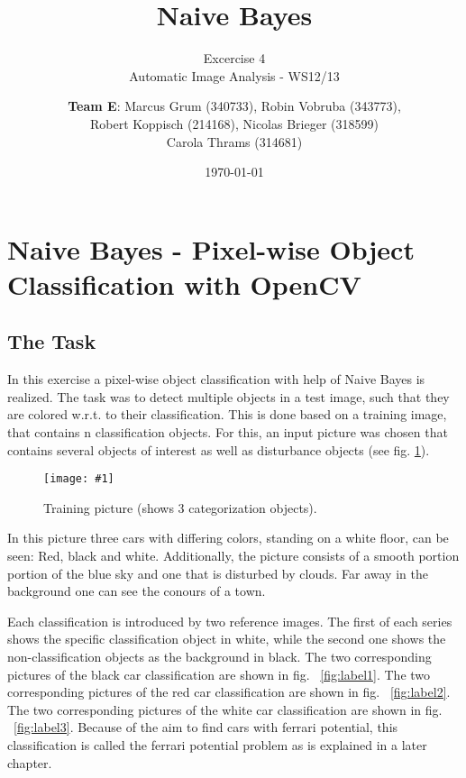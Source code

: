\documentclass[a4paper,headings=small]{scrartcl}
\title{Naive Bayes}
\subtitle{Excercise 4 \\ Automatic Image Analysis - WS12/13}
\author{\textbf{Team E}: Marcus Grum (340733), Robin Vobruba (343773), \\ Robert Koppisch (214168), Nicolas Brieger (318599)\\Carola Thrams (314681)}
\date{\today}
\numberwithin{equation}{section} %
\numberwithin{figure}{section}   %
\newcommand{\image}[3]{
	\begin{figure}[htbp]
		\centering
		\texttt{[image: \#1]}
		\caption{#3}
		\label{fig:#1}
	\end{figure}
}
\newcommand{\generatedImgRoot}{../resources/img}
\begin{document}
\maketitle


\section{Naive Bayes - Pixel-wise Object Classification with OpenCV}


\subsection{The Task}
In this exercise a pixel-wise object classification with help of Naive Bayes is realized.
The task was to detect multiple objects in a test image,
such that they are colored w.r.t. to their classification.
This is done based on a training image, that contains n classification objects.
For this, an input picture was chosen that contains several objects of interest as well as disturbance objects (see fig. \ref{fig:\generatedImgRoot/Input.png}).

\image{\generatedImgRoot/Input.png}{0.9}{%
		Training picture (shows 3 categorization objects).}
\newpage
In this picture three cars with differing colors, standing on a white floor, can be seen: Red, black and white.
Additionally, the picture consists of a smooth portion portion of the blue sky and one that is disturbed by clouds.
Far away in the background one can see the conours of a town.

Each classification is introduced by two reference images.
The first of each series shows the specific classification object in white,
while the second one shows the non-classification objects as the background in black.
The two corresponding pictures of the black car classification are shown in fig. ~\ref{fig:label1}.
The two corresponding pictures of the red car classification are shown in fig. ~\ref{fig:label2}.
The two corresponding pictures of the white car classification are shown in fig. ~\ref{fig:label3}.
Because of the aim to find cars with ferrari potential, this classification is called
the ferrari potential problem as is explained in a later chapter.
\end{document}
